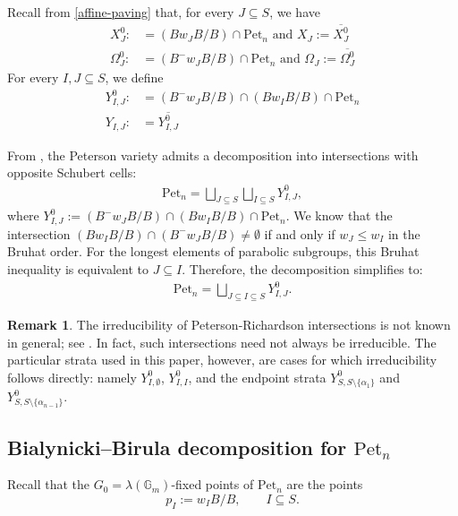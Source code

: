 \documentclass[12pt, reqno]{amsart}
\theoremstyle{plain}
\numberwithin{equation}{section}
\theoremstyle{definition}
\newtheorem{remark}{Remark}
\begin{document}
Recall from \ref{affine-paving} that, for every $J\subseteq S$, we have \begin{align}
	X_{J}^{0}:&= (Bw_{J}B/B)\cap \mathrm{Pet}_{n} \text{ and } X_{J}:=\overline{X_{J}^{0}}\\
	\Omega_{J}^{0}:&=(B^{-}w_{J}B/B)\cap \mathrm{Pet}_{n}\text{ and }\Omega_{J}:=\overline{\Omega_{J}^{0}}
\end{align}
For every $I,J\subseteq S$, we define \begin{align}
	Y^{0}_{I,J}:&=(B^{-}w_{J}B/B)\cap (Bw_{I}B/B)\cap \mathrm{Pet}_{n}\\
	Y_{I,J}:&=\overline{Y^{0}_{I,J}}
\end{align}


From \cite[Lemma 3.5]{Abe}, the Peterson variety admits a decomposition into intersections with opposite Schubert cells:
\begin{align*}
    \mathrm{Pet}_{n} = \bigsqcup_{J\subseteq S}\bigsqcup_{I\subseteq S} Y^{0}_{I,J},
\end{align*}
where $Y^{0}_{I,J} := (B^{-}w_{J}B/B) \cap (Bw_{I}B/B) \cap \mathrm{Pet}_{n}$. We know that the intersection $(Bw_{I}B/B) \cap (B^{-}w_{J}B/B) \neq \emptyset$ if and only if $w_{J} \leq w_{I}$ in the Bruhat order. For the longest elements of parabolic subgroups, this Bruhat inequality is equivalent to $J \subseteq I$. Therefore, the decomposition simplifies to:
\begin{align}\label{Section 3: Eq 3.1.1}
    \mathrm{Pet}_{n} = \bigsqcup_{J \subseteq I \subseteq S} Y^{0}_{I,J}.
\end{align}

\begin{remark} The irreducibility of Peterson-Richardson intersections is not known in general; see \cite[Question~7.6(i)]{Horiguchi}. In fact, such intersections need not always be irreducible. The particular strata used in this paper, however, are cases for which irreducibility follows directly: namely \(Y^0_{I,\emptyset}\), \(Y^0_{I,I}\), and the endpoint strata \(Y^0_{S,S\setminus\{\alpha_1\}}\) and \(Y^0_{S,S\setminus\{\alpha_{n-1}\}}\). \end{remark}

\subsection{Bialynicki--Birula decomposition for $\mathrm{Pet}_n$} Recall that the
$G_0=\lambda(\mathbb G_m)$-fixed points of $\mathrm{Pet}_n$ are the points
\[
p_I := w_{I}B/B, \qquad I \subseteq S.
\]
\end{document}
